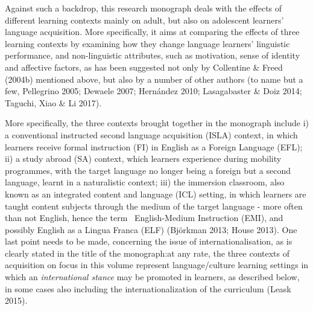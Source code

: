 \documentclass[12pt]{article}
\newenvironment{styleStandard}{\setlength\leftskip{0cm}\setlength\rightskip{0cm plus 1fil}\setlength\parindent{0cm}\setlength\parfillskip{0pt plus 1fil}\setlength\parskip{0in plus 1pt}\writerlistparindent\writerlistleftskip\leavevmode\normalfont\normalsize\writerlistlabel\ignorespaces}{\unskip\vspace{0.111in plus 0.0111in}\par}
\newcommand\writerlistleftskip{}
\newcommand\writerlistparindent{}
\newcommand\writerlistlabel{}
\begin{document}
\begin{styleStandard}
Against such a backdrop, this research monograph deals with the effects of different learning contexts mainly on adult, but also on adolescent learners’ language acquisition. More specifically, it aims at comparing the effects of three learning contexts by examining how they change language learners’ linguistic performance, and non-linguistic attributes, such as motivation, sense of identity and affective factors, as has been suggested not only by Collentine \& Freed (2004b) mentioned above, but also by a number of other authors (to name but a few, Pellegrino 2005; Dewaele 2007; Hernández 2010; Lasagabaster \& Doiz 2014; Taguchi, Xiao \& Li 2017). 
\end{styleStandard}

\begin{styleStandard}
More specifically, the three contexts brought together in the monograph include i) a conventional instructed second language acquisition (ISLA) context, in which learners receive formal instruction (FI) in English as a Foreign Language (EFL); ii) a study abroad (SA) context, which learners experience during mobility programmes, with the target language no longer being a foreign but a second language, learnt in a naturalistic context; iii) the immersion classroom, also known as an integrated content and language (ICL) setting, in which learners are taught content subjects through the medium of the target language - more often than not English, hence the term \ English-Medium Instruction (EMI), and possibly English as a Lingua Franca (ELF) (Björkman 2013; House 2013). One last point needs to be made, concerning the issue of internationalisation, as is clearly stated in the title of the monograph:at any rate, the three contexts of acquisition on focus in this volume represent language/culture learning settings in which an \textit{international stance} may be promoted in learners, as described below, in some cases also including the internationalization of the curriculum (Leask 2015). 
\end{styleStandard}
\end{document}
